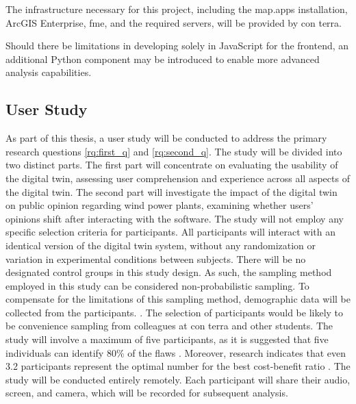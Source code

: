 \documentclass[11pt, titlepage, a4paper]{scrartcl}
\begin{document}
\begin{linenumbers}
    The infrastructure necessary for this project, including the map.apps installation, ArcGIS Enterprise, \gls{fme}, and the required servers, will be provided by con terra.

    Should there be limitations in developing solely in JavaScript for the frontend, an additional Python component may be introduced to enable more advanced analysis capabilities.


    \subsection{User Study}
    As part of this thesis, a user study will be conducted to address the primary research questions \cref{rq:first_q} and \cref{rq:second_q}. The study will be divided into two distinct parts. The first part will concentrate on evaluating the usability of the digital twin, assessing user comprehension and experience across all aspects of the digital twin. The second part will investigate the impact of the digital twin on public opinion regarding wind power plants, examining whether users' opinions shift after interacting with the software.
    The study will not employ any specific selection criteria for participants. All participants will interact with an identical version of the digital twin system, without any randomization or variation in experimental conditions between subjects. There will be no designated control groups in this study design. As such, the sampling method employed in this study can be considered non-probabilistic sampling. To compensate for the limitations of this sampling method, demographic data will be collected from the participants. \cite{lazarResearchMethodsHuman2017}. The selection of participants would be likely to be convenience sampling from colleagues at con terra and other students.
    The study will involve a maximum of five participants, as it is suggested that five individuals can identify 80\% of the flaws \cite{virziRefiningTestPhase1992}. Moreover, research indicates that even 3.2 participants represent the optimal number for the best cost-benefit ratio \cite{nielsenMathematicalModelFinding1993}.
    The study will be conducted entirely remotely. Each participant will share their audio, screen, and camera, which will be recorded for subsequent analysis. 

\end{linenumbers}
\end{document}
